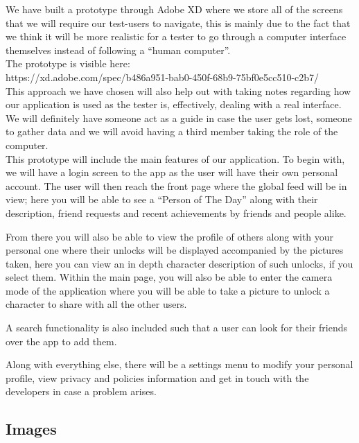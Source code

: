 \documentclass[12pt]{scrartcl}
\begin{document}
		
		We have built a prototype through Adobe XD where we store all of the screens that we will
		require our test-users to navigate, this is mainly due to the fact that we think it will be more
		realistic for a tester to go through a computer interface themselves instead of following a 
		``human computer''.\\
		
		The prototype is visible here:\\
		https://xd.adobe.com/spec/b486a951-bab0-450f-68b9-75bf0e5cc510-c2b7/\\
		
		This approach we have chosen will also help out with taking notes regarding how our 
		application is used as the tester is, effectively, dealing with a real interface. We will definitely 
		have someone act as a guide in case the user gets lost, someone to gather data and we will 
		avoid having a third member taking the role of the computer.\\
	
		This prototype will include the main features of our application. To begin with, we will have a 
		login screen to the app as the user will have their own personal account. The user will then 
		reach the front page where the global feed will be in view; here you will be able to see a 
		``Person of The  Day'' along with their description, friend requests and recent achievements by 
		friends and  people alike. 
	
		From there you will also be able to view the profile of others along with your personal one where
		their unlocks will be displayed accompanied by the pictures taken, here you can view an in 
		depth 
		character description of such unlocks, if you select them. Within the main page, you will also 
		be able to enter the camera mode of the application where you will be able to take a picture to 
		unlock a character to share with all the other users.
	
		A search functionality is also included such that a user can look for their friends over the app
		to add them.
	
		Along with everything else, there will be a settings menu to modify your personal profile, view
		privacy and policies information and get in touch with the developers in case a problem arises.
		
		
	\subsection{Images}
	
\end{document}
